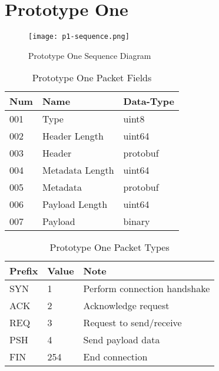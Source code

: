 \section{Prototype One}
\begin{figure}[h!]
    \centering
    \texttt{[image: p1-sequence.png]}
    \caption{Prototype One Sequence Diagram}
    \label{fig:p1-sequence}
\end{figure}

\begin{table}[h!]
	\caption{Prototype One Packet Fields}
	\label{tab:p1d-packet-fields}
	\centering
	\begin{tabular}{ l l l }
		\hline
		\textbf{Num} & \textbf{Name}   & \textbf{Data-Type} \\
		\hline
		001          & Type            & uint8              \\
		\hline
		002          & Header Length   & uint64             \\
		\hline
		003          & Header          & protobuf           \\
		\hline
		004          & Metadata Length & uint64             \\
		\hline
		005          & Metadata        & protobuf           \\
		\hline
		006          & Payload Length  & uint64             \\
		\hline
		007          & Payload         & binary             \\
		\hline
	\end{tabular}
\end{table}

\begin{table}[h!]
	\caption{Prototype One Packet Types}
	\label{tab:p1d-packet-types}
	\centering
	\begin{tabular}{ l l l }
		\hline
		\textbf{Prefix} & \textbf{Value} & \textbf{Note}                \\
		\hline
		SYN             & 1              & Perform connection handshake \\
		\hline
		ACK             & 2              & Acknowledge request          \\
		\hline
		REQ             & 3              & Request to send/receive      \\
		\hline
		PSH             & 4              & Send payload data            \\
		\hline
		FIN             & 254            & End connection               \\
		\hline
	\end{tabular}
\end{table}

